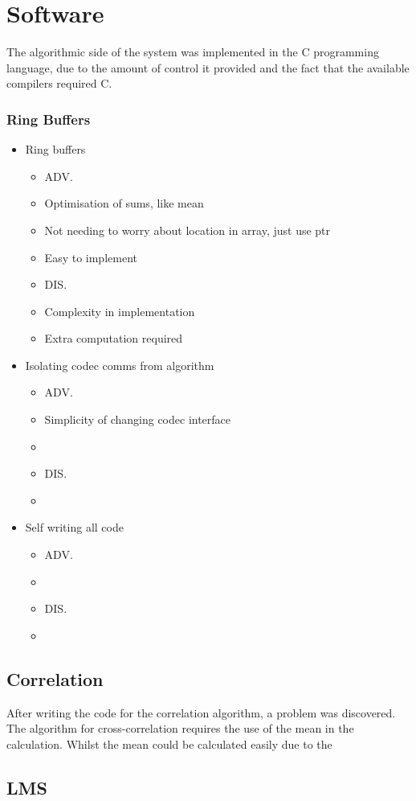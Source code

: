 \section{Software}
The algorithmic side of the system was implemented in the C programming language, due to the amount of control it provided and the fact that the available compilers required C.

\subsubsection{Ring Buffers}

\begin{itemize}
\item Ring buffers
	\begin{itemize}
	\item ADV.
	\item Optimisation of sums, like mean
	\item Not needing to worry about location in array, just use ptr
	\item Easy to implement
	\item DIS.
	\item Complexity in implementation
	\item Extra computation required
	\end{itemize}
\item Isolating codec comms from algorithm
	\begin{itemize}
	\item ADV.
	\item Simplicity of changing codec interface
	\item 
	\item DIS.
	\item 
	\end{itemize}
\item Self writing all code
	\begin{itemize}
	\item ADV.
	\item 
	\item DIS.
	\item 
	\end{itemize}
\end{itemize}

\subsection{Correlation}

After writing the code for the correlation algorithm, a problem was discovered.
The algorithm for cross-correlation requires the use of the mean in the calculation.
Whilst the mean could be calculated easily due to the 

\subsection{LMS}

